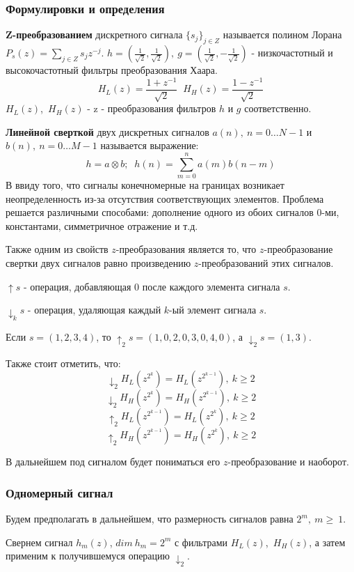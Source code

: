 \documentclass{article}
\begin{document}
\subsubsection{Формулировки и определения}
\textbf{Z-преобразованием} дискретного сигнала $\{s_j\}_{ j \in Z}$ называется полином Лорана 
$P_{s}(z) = \sum  \limits_{j \in Z} s_{j}z^{-j}$.
$h = (\frac{1}{\sqrt{2}}, \frac{1}{\sqrt{2}}),~g = (\frac{1}{\sqrt{2}}, -\frac{1}{\sqrt{2}})$ - низкочастотный и высокочастотный фильтры преобразования Хаара.
$$ H_{L}(z) = \frac{1 + z^{-1}}{\sqrt{2}} \;\; H_{H}(z) = \frac{1 - z^{-1}}{\sqrt{2}} $$
$H_{L}(z)$,~$H_{H}(z)$ - z - преобразования фильтров $h$ и $g$ соответственно.

\textbf{Линейной сверткой} двух дискретных сигналов $a(n),~ n=0 \ldots N-1$ и $b(n),~ n=0 \ldots M-1$ называется выражение:
$$ h = a \otimes b; \;\; h(n) =  \sum_{m=0}^{n} a(m)b(n-m) $$
В ввиду того, что сигналы конечномерные на границах возникает неопределенность из-за отсутствия соответствующих элементов. Проблема решается различными способами: дополнение одного из обоих сигналов $0$-ми, константами, симметричное отражение и т.д.

Также одним из свойств $z$-преобразования является то, что $z$-преобразование свертки двух сигналов равно произведению $z$-преобразований этих сигналов. 

\textbf{$\uparrow s$} - операция, добавляющая $0$ после каждого элемента сигнала $s$.

\textbf{$\downarrow_k s$} - операция, удаляющая каждый $k$-ый элемент сигнала $s$.

Если $s = (1,2,3,4)$, то $\uparrow_2 s = (1,0,2,0,3,0,4,0)$, а $\downarrow_{2} s = (1,3)$.

Также стоит отметить, что:
$$\downarrow_2 H_L(z^{2^k}) = H_L(z^{2^{k-1}}),~ k\geq 2$$
$$\downarrow_2 H_H(z^{2^k}) = H_H(z^{2^{k-1}}),~ k\geq 2$$
$$\uparrow_2 H_L(z^{2^{k-1}}) = H_L(z^{2^{k}}),~ k\geq 2$$
$$\uparrow_2 H_H(z^{2^{k-1}}) = H_H(z^{2^{k}}),~ k\geq 2$$

В дальнейшем под сигналом будет пониматься его $z$-преобразование и наоборот.
\subsubsection{Одномерный сигнал}
Будем предполагать в дальнейшем, что размерность сигналов равна $2^m,~m \geq~1$.

Свернем сигнал $h_m(z)$, $dim~h_m = 2^m$ с фильтрами $H_L(z)$,~$H_H(z)$, а затем применим к получившемуся операцию $\downarrow_2$.
\end{document}
